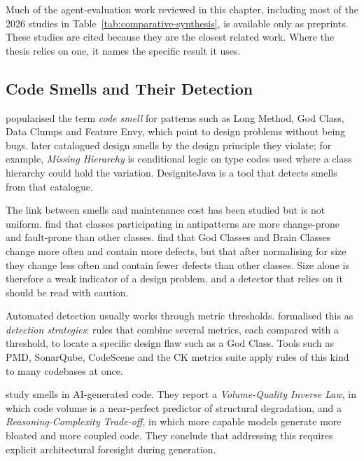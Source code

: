 Much of the agent-evaluation work reviewed in this chapter, including most of the 2026 studies in
Table~\ref{tab:comparative-synthesis}, is available only as preprints. These studies are cited
because they are the closest related work. Where the thesis relies on one, it names the specific
result it uses.

\subsection{Code Smells and Their Detection}
\label{sec:code-smells}

\citet{fowler1999refactoring} popularised the term \emph{code smell} for patterns such as Long
Method, God Class, Data Clumps and Feature Envy, which point to design problems without being bugs.
\citet{suryanarayana2014smells} later catalogued design smells by the design principle they violate;
for example, \emph{Missing Hierarchy} is conditional logic on type codes used where a class
hierarchy could hold the variation. DesigniteJava is a tool that detects smells from that
catalogue.

The link between smells and maintenance cost has been studied but is not uniform.
\citet{khomh2012antipatterns} find that classes participating in antipatterns are more change-prone
and fault-prone than other classes. \citet{olbrich2010godclass} find that God Classes and Brain
Classes change more often and contain more defects, but that after normalising for size they change
less often and contain fewer defects than other classes. Size alone is therefore a weak indicator of
a design problem, and a detector that relies on it should be read with caution.

Automated detection usually works through metric thresholds. \citet{marinescu2004detection}
formalised this as \emph{detection strategies}: rules that combine several metrics, each compared
with a threshold, to locate a specific design flaw such as a God Class. Tools such as PMD,
SonarQube, CodeScene and the CK metrics suite apply rules of this kind to many codebases at once.

\citet{zhu2026smells} study smells in AI-generated code. They report a \emph{Volume-Quality Inverse
Law}, in which code volume is a near-perfect predictor of structural degradation, and a
\emph{Reasoning-Complexity Trade-off}, in which more capable models generate more bloated and more
coupled code. They conclude that addressing this requires explicit architectural foresight during
generation.

